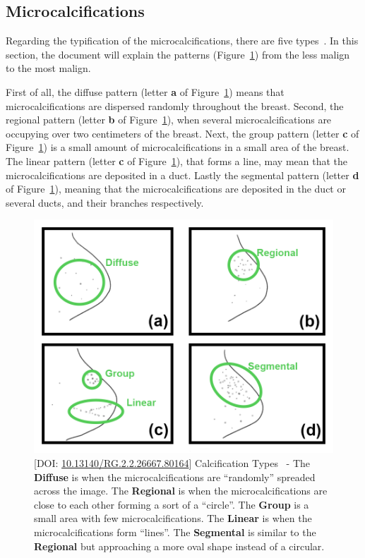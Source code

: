\subsection{Microcalcifications}
\label{sec:chap002004002}

Regarding the typification of the microcalcifications, there are five types~\cite{nadia2020xai}.
In this section, the document will explain the patterns (Figure~\ref{fig:fig022}) from the less malign to the most malign.

First of all, the diffuse pattern (letter {\bf a} of Figure~\ref{fig:fig022}) means that microcalcifications are dispersed randomly throughout the breast.
Second, the regional pattern (letter {\bf b} of Figure~\ref{fig:fig022}), when several microcalcifications are occupying over two centimeters of the breast.
Next, the group pattern (letter {\bf c} of Figure~\ref{fig:fig022}) is a small amount of microcalcifications in a small area of the breast.
The linear pattern (letter {\bf c} of Figure~\ref{fig:fig022}), that forms a line, may mean that the microcalcifications are deposited in a duct.
Lastly the segmental pattern (letter {\bf d} of Figure~\ref{fig:fig022}), meaning that the microcalcifications are deposited in the duct or several ducts, and their branches respectively.

\begin{figure}[htbp]
\centering
\includegraphics[width=\columnwidth]{images/fig022}
\caption{[DOI: \href{https://doi.org/10.13140/RG.2.2.26667.80164}{10.13140/RG.2.2.26667.80164}] Calcification Types~\cite{nadia2020maivect} - The {\bf Diffuse} is when the microcalcifications are ``randomly'' spreaded across the image. The {\bf Regional} is when the microcalcifications are close to each other forming a sort of a ``circle''. The {\bf Group} is a small area with few microcalcifications. The {\bf Linear} is when the microcalcifications form ``lines''. The {\bf Segmental} is similar to the {\bf Regional} but approaching a more oval shape instead of a circular.}
\label{fig:fig022}
\end{figure}

